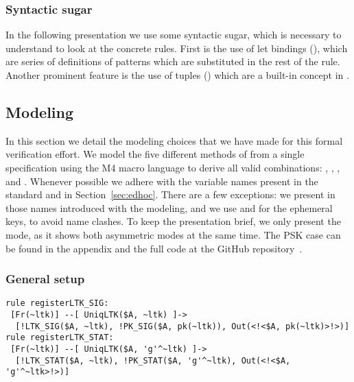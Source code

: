\spacehack
\subsubsection{Syntactic sugar} In the following presentation we use some syntactic
sugar, which is necessary to understand to look at the concrete rules. First is
the use of let bindings (), which are series of
definitions of patterns which are substituted in the rest of the rule. Another
prominent feature is the use of tuples () which are a
built-in concept in \mTamarin.

\spacehack
\subsection{Modeling \mEdhoc{}}
\fillhack
In this section we detail the modeling choices that we have made for this formal
verification effort.
%
We model the five different methods of \mEdhoc{} from a single specification
using the M4 macro language to derive all valid combinations: \mPskPsk,
\mSigSig, \mSigStat, \mStatSig{} and \mStatStat.
%
Whenever possible we adhere with the variable names present in the standard and
in Section~\ref{sec:edhoc}. There are a few exceptions: we present in
 those names introduced with the modeling, and we use  and
 for the ephemeral keys, to avoid name clashes.
%
%
To keep the presentation brief, we only present the \mStatSig{} mode, as it
shows both asymmetric modes at the same time. The PSK case can be found in the
appendix and the full code at the GitHub repository~\cite{edhocTamarinRepo}.

\spacehack
\subsubsection{General setup}
\begin{lstlisting}
rule registerLTK_SIG:
 [Fr(~ltk)] --[ UniqLTK($A, ~ltk) ]->
  [!LTK_SIG($A, ~ltk), !PK_SIG($A, pk(~ltk)), Out(<!<$A, pk(~ltk)>!>)]
rule registerLTK_STAT:
 [Fr(~ltk)] --[ UniqLTK($A, 'g'^~ltk) ]->
  [!LTK_STAT($A, ~ltk), !PK_STAT($A, 'g'^~ltk), Out(<!<$A, 'g'^~ltk>!>)]
\end{lstlisting}

